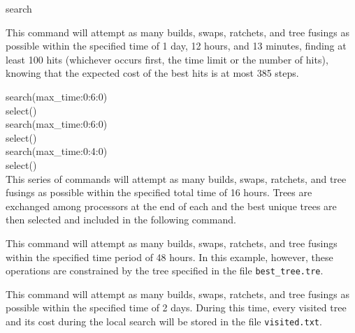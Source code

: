 \begin{command}{search}{}
\begin{arguments}


\end{arguments}


\begin{poyexamples}

{This command will attempt as many builds, swaps, ratchets, and tree
fusings as possible within the specified time of 1 day, 12 hours, and 13
minutes, finding at least 100 hits (whichever occurs first, the time
limit or the number of hits), knowing that the expected cost of the
best hits is at most 385 steps.}

{{search(max\_time:0:6:0)}\\
{select()}\\
{search(max\_time:0:6:0)}\\
{select()}\\
{search(max\_time:0:4:0)}\\
{select()}\\
{This series of commands will attempt as many builds, swaps, ratchets, and tree
fusings as possible within the specified total time of 16 hours. Trees are exchanged among
processors at the end of each  and the best unique trees
are then selected and included in the following
 command.}}

{This command will attempt as many builds, swaps, ratchets, and tree
fusings within the specified time period of 48 hours. In this example, however, these 
operations are constrained by the tree specified in the file \texttt{best\_tree.tre}.} 

{This command will attempt as many builds, swaps, ratchets, and tree
fusings as possible within the specified time of 2 days. During this 
time, every visited tree and its cost during the local search will be stored in the file
\texttt{visited.txt}.}

\end{poyexamples}

\begin{poyalso}
\end{poyalso}

\end{command}

